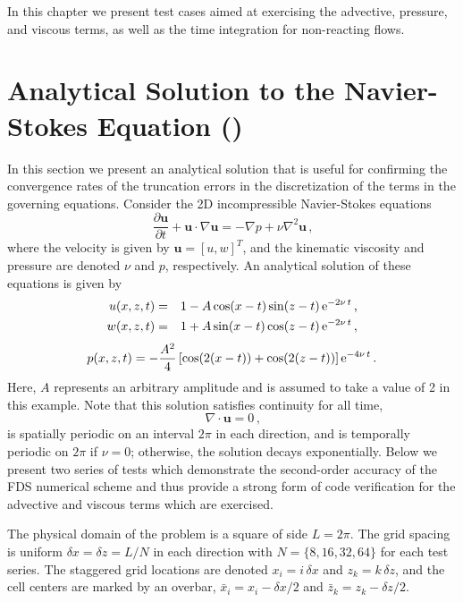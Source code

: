 \documentclass[11pt]{book}
\begin{document}
In this chapter we present test cases aimed at exercising the advective, pressure, and viscous terms, as well as the time integration for non-reacting flows.


\section{Analytical Solution to the Navier-Stokes Equation (\texorpdfstring{}{ns2d})}
\label{ns2d}
\label{ns2d_64_nupt1}

In this section we present an analytical solution that is useful for confirming the convergence rates of the truncation errors in the discretization of the terms in
the governing equations. Consider the 2D incompressible Navier-Stokes equations
\begin{equation}
\label{eqn_NS}
\frac{\partial \mathbf{u}}{\partial t} + \mathbf{u} \cdot \nabla \mathbf{u} = - \nabla{p} + \nu \nabla^2 \mathbf{u} \,\mbox{,}
\end{equation}
where the velocity is given by $\mathbf{u} = [u, w]^T$, and the kinematic viscosity and pressure are denoted $\nu$ and $p$, respectively.
An analytical solution of these equations is given by \cite{McDermott:NS2D}
\begin{eqnarray}
\label{eqn_usoln}
u(x,z,t) &=& 1 - A\cos(x-t)\sin(z-t)\,{\rm e}^{-2\nu\, t} \,\mbox{,} \\
w(x,z,t) &=& 1 + A\sin(x-t)\cos(z-t)\,{\rm e}^{-2\nu\, t} \,\mbox{,}
\end{eqnarray}
\begin{equation}
p(x,z,t) = -\frac{A^2}{4} \left[ \cos(2(x-t))+\cos(2(z-t))\right]{\rm e}^{-4\nu\, t} \,\mbox{.}
\end{equation}
Here, $A$ represents an arbitrary amplitude and is assumed to take a value of 2 in this example.
Note that this solution satisfies continuity for all time,
\begin{equation}
\label{eqn_divfree}
\nabla\cdot\mathbf{u} = 0 \,\mbox{,}
\end{equation}
is spatially periodic on an interval $2\pi$ in each direction, and is temporally periodic on $2\pi$ if $\nu=0$; otherwise, the solution decays exponentially.
Below we present two series of tests which demonstrate the second-order accuracy of the FDS numerical scheme and thus provide a strong form of code verification
for the advective and viscous terms which are exercised.

The physical domain of the problem is a square of side $L=2\pi$.  The grid spacing is uniform $\delta x = \delta z = L/N$ in each direction
with $N =\{8,16,32,64\}$ for each test series.  The staggered grid locations are denoted $x_i = i \, \delta x$ and $z_k = k \, \delta z$, and the cell
centers are marked by an overbar, $\bar{x}_i = x_i - \delta x/2$ and $\bar{z}_k = z_k - \delta z/2$.
\end{document}
